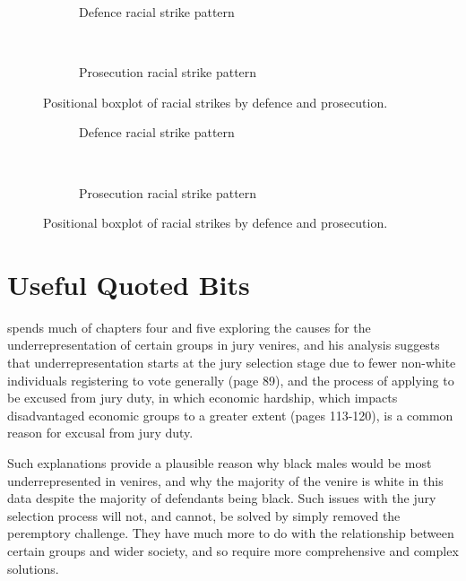 \begin{figure}[h!]
  \centering
  \begin{subfigure}{0.7\textwidth}
    \caption{\footnotesize Defence racial strike pattern}
    \label{fig:defracestrike}
  \end{subfigure}
  ~
  \begin{subfigure}{0.7\textwidth}
    \caption{\footnotesize Prosecution racial strike pattern}
    \label{fig:proracestrike}
  \end{subfigure}
  \caption[Racial Strike Pattern by Party]
  {\footnotesize Positional boxplot of racial strikes by defence and prosecution.}
  \label{fig:defandpros}
\end{figure}

\begin{figure}[h!]
  \centering
  \begin{subfigure}{0.7\textwidth}
    \caption{\footnotesize Defence racial strike pattern}
    \label{fig:defraceprop}
  \end{subfigure}
  ~
  \begin{subfigure}{0.7\textwidth}
    \caption{\footnotesize Prosecution racial strike pattern}
    \label{fig:proraceprop}
  \end{subfigure}
  \caption[Racial Strike Proportions by Party]
  {\footnotesize Positional boxplot of racial strikes by defence and prosecution.}
  \label{fig:defproprop}
\end{figure}

\section{Useful Quoted Bits}

\cite{vandykejurysel} spends much of chapters four and five exploring the causes for the underrepresentation of certain groups in
jury venires, and his analysis suggests that underrepresentation starts at the jury selection stage due to fewer non-white
individuals registering to vote generally (page 89), and the process of applying to be excused from jury duty, in which economic
hardship, which impacts disadvantaged economic groups to a greater extent (pages 113-120), is a common reason for excusal from
jury duty.

Such explanations provide a plausible reason why black males would be most underrepresented in venires, and why the majority of
the venire is white in this data despite the majority of defendants being black. Such issues with the jury selection process will
not, and cannot, be solved by simply removed the peremptory challenge. They have much more to do with the relationship between
certain groups and wider society, and so require more comprehensive and complex solutions.